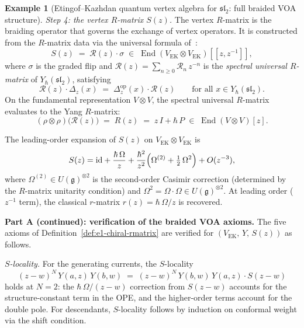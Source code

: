 \documentclass[11pt,reqno]{amsart}
\theoremstyle{definition}
\newtheorem{example}[theorem]{Example}
\theoremstyle{remark}
\DeclareMathOperator{\End}{End}
\newcommand{\fg}{\mathfrak{g}}
\newcommand{\id}{\mathrm{id}}
\numberwithin{equation}{section}
\begin{document}
\begin{example}[Etingof--Kazhdan quantum vertex algebra for
$\mathfrak{sl}_2$: full braided VOA structure]
\smallskip
\noindent\emph{Step 4: the vertex $R$-matrix $S(z)$.}
The vertex $R$-matrix is the braiding operator that
governs the exchange of vertex operators. It is constructed
from the $R$-matrix data via the universal formula
of~\cite{EK00}:
\begin{equation}\label{eq:ek-vertex-rmatrix}
  S(z)
  \;=\;
  \mathcal{R}(z)
  \cdot \sigma
  \;\in\; \End(V_{\mathrm{EK}} \otimes V_{\mathrm{EK}})[\![z, z^{-1}]\!],
\end{equation}
where $\sigma$ is the graded flip and
$\mathcal{R}(z) = \sum_{n \geq 0} \mathcal{R}_n\, z^{-n}$
is the \emph{spectral universal $R$-matrix} of
$Y_\hbar(\mathfrak{sl}_2)$, satisfying
\begin{equation}\label{eq:ek-rmatrix-coprod}
  \mathcal{R}(z) \cdot \Delta_z(x)
  \;=\;
  \Delta_z^{\mathrm{op}}(x) \cdot \mathcal{R}(z)
  \qquad \text{for all } x \in Y_\hbar(\mathfrak{sl}_2).
\end{equation}
On the fundamental representation $V \otimes V$, the
spectral universal $R$-matrix evaluates to the Yang
$R$-matrix:
\begin{equation}\label{eq:ek-rmatrix-fund}
  (\rho \otimes \rho)\bigl(\mathcal{R}(z)\bigr)
  \;=\; R(z)
  \;=\; z\,I + \hbar\,P
  \;\in\; \End(V \otimes V)[z].
\end{equation}

The leading-order expansion of $S(z)$ on
$V_{\mathrm{EK}} \otimes V_{\mathrm{EK}}$ is
\begin{equation}\label{eq:ek-s-expansion}
  S(z) = \id + \frac{\hbar\,\Omega}{z}
  + \frac{\hbar^2}{z^2}\Bigl(
  \Omega^{(2)} + \tfrac{1}{2}\,\Omega^2
  \Bigr) + O(z^{-3}),
\end{equation}
where $\Omega^{(2)} \in U(\fg)^{\otimes 2}$ is the
second-order Casimir correction (determined by the
$R$-matrix unitarity condition) and
$\Omega^2 = \Omega \cdot \Omega \in U(\fg)^{\otimes 2}$.
At leading order ($z^{-1}$ term), the classical $r$-matrix
$r(z) = \hbar\,\Omega/z$ is recovered.

\medskip
\noindent
\textbf{Part A (continued): verification of the braided VOA
axioms.}
The five axioms of
Definition~\ref{def:e1-chiral-rmatrix} are verified for
$(V_{\mathrm{EK}},\, Y,\, S(z))$ as follows.

\smallskip
\noindent\emph{$S$-locality.}
For the generating currents, the $S$-locality
\begin{equation}\label{eq:ek-s-locality}
  (z - w)^N\, Y(a, z)\, Y(b, w)
  \;=\;
  (z - w)^N\, Y(b, w)\, Y(a, z) \cdot S(z - w)
\end{equation}
holds at $N = 2$: the $\hbar\,\Omega/(z-w)$ correction from
$S(z-w)$ accounts for the structure-constant term in the OPE,
and the higher-order terms account for the double pole.
For descendants, $S$-locality follows by induction on
conformal weight via the shift condition.


\end{example}
\end{document}

